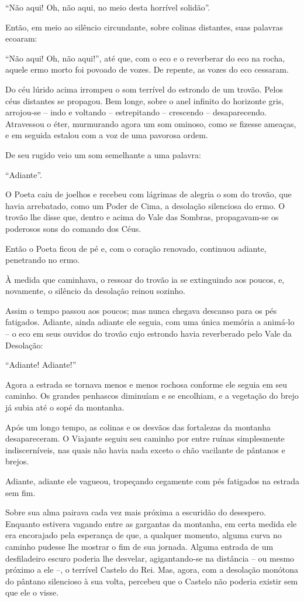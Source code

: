 ``Não aqui! Oh, não aqui, no meio desta horrível solidão''.

Então, em meio ao silêncio circundante, sobre colinas distantes, suas
palavras ecoaram:

``Não aqui! Oh, não aqui!'', até que, com o eco e o reverberar do eco na
rocha, aquele ermo morto foi povoado de vozes.
\smallskip
De repente, as vozes do eco cessaram.

Do céu lúrido acima irrompeu o som terrível do estrondo de um trovão.
Pelos céus distantes se propagou. Bem longe, sobre o anel infinito do
horizonte gris, arrojou-se -- indo e voltando -- estrepitando --
crescendo -- desaparecendo. Atravessou o éter, murmurando agora um som
ominoso, como se fizesse ameaças, e em seguida estalou com a voz de uma
pavorosa ordem.

De seu rugido veio um som semelhante a uma palavra:

``Adiante''.

O Poeta caiu de joelhos e recebeu com lágrimas de alegria o som do
trovão, que havia arrebatado, como um Poder de Cima, a desolação
silenciosa do ermo. O trovão lhe disse que, dentro e acima do Vale das
Sombras, propagavam-se os poderosos sons do comando dos Céus.

Então o Poeta ficou de pé e, com o coração renovado, continuou adiante,
penetrando no ermo.

À medida que caminhava, o ressoar do trovão ia se extinguindo aos
poucos, e, novamente, o silêncio da desolação reinou sozinho.

Assim o tempo passou aos poucos; mas nunca chegava descanso para os pés
fatigados. Adiante, ainda adiante ele seguia, com uma única memória a
animá-lo -- o eco em seus ouvidos do trovão cujo estrondo havia
reverberado pelo Vale da Desolação:

``Adiante! Adiante!''

Agora a estrada se tornava menos e menos rochosa conforme ele seguia em
seu caminho. Os grandes penhascos diminuíam e se encolhiam, e a
vegetação do brejo já subia até o sopé da montanha.

Após um longo tempo, as colinas e os desvãos das fortalezas da montanha
desapareceram. O Viajante seguiu seu caminho por entre ruínas
simplesmente indiscerníveis, nas quais não havia nada exceto o chão
vacilante de pântanos e brejos.

Adiante, adiante ele vagueou, tropeçando cegamente com pés fatigados na
estrada sem fim.

Sobre sua alma pairava cada vez mais próxima a escuridão do desespero.
Enquanto estivera vagando entre as gargantas da montanha, em certa
medida ele era encorajado pela esperança de que, a qualquer momento,
alguma curva no caminho pudesse lhe mostrar o fim de sua jornada. Alguma
entrada de um desfiladeiro escuro poderia lhe desvelar, agigantando-se
na distância -- ou mesmo próximo a ele --, o terrível Castelo do Rei.
Mas, agora, com a desolação monótona do pântano silencioso à sua volta,
percebeu que o Castelo não poderia existir sem que ele o visse.


